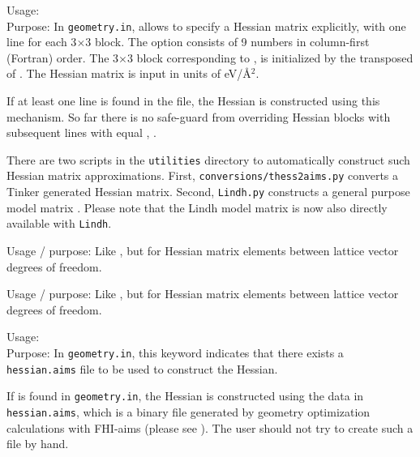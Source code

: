 {
  \noindent 
  Usage:    \\[1.0ex]
  Purpose: In \texttt{geometry.in}, allows to specify a Hessian matrix
  explicitly, with one line for each 3$\times3$ block.  The option
   consists of 9 numbers in column-first (Fortran) order.  The
  3$\times$3 block corresponding to ,  is
  initialized by the transposed of . The Hessian matrix is input
  in units of eV/\AA$^2$.\\
} 

If at least one  line is found in the file, the
Hessian is constructed using this mechanism.  So far there is no safe-guard
from overriding Hessian blocks with subsequent lines with equal
, .

There are two scripts in the \texttt{utilities} directory to automatically
construct such Hessian matrix approximations.  First,
\texttt{conversions/thess2aims.py} converts a Tinker generated Hessian matrix.
Second, \texttt{Lindh.py} constructs a general purpose model matrix
\cite{Lin95}.  Please note that the Lindh model matrix is now also directly
available with  \texttt{Lindh}.

{
  \noindent 
  Usage / purpose: Like , but for Hessian
  matrix elements between lattice vector degrees of freedom.\\
} 

{
  \noindent 
  Usage / purpose: Like , but for Hessian
  matrix elements between lattice vector degrees of freedom.\\
} 

{
  \noindent
  Usage: \\[1.0ex]
  Purpose: In \texttt{geometry.in}, this keyword indicates that there exists
  a \texttt{hessian.aims} file to be used to construct the Hessian.\\
}

If  is found in \texttt{geometry.in}, the Hessian is
constructed using the data in \texttt{hessian.aims}, which is a binary file
generated by geometry optimization calculations with FHI-aims (please see
).  The user should not try to create such a
file by hand.

